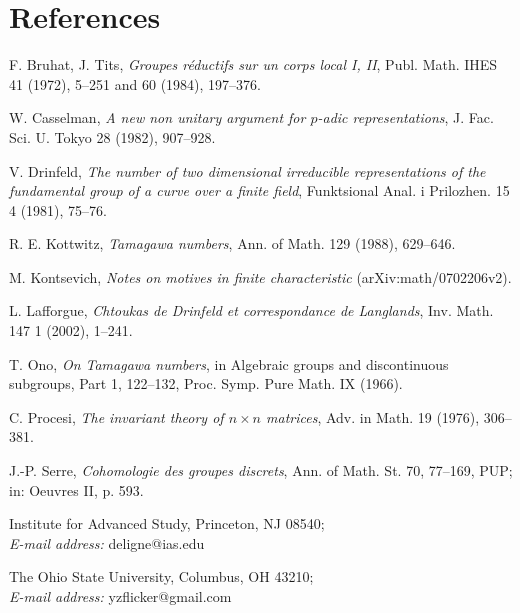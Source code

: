 \documentclass[10pt]{article}
\theoremstyle{deligne}
\begin{document}
\section*{References}
\begin{description}[leftmargin=2.7em,labelwidth=2.4em,style=nextline]
\item[{[BT]}] F. Bruhat, J. Tits, \emph{Groupes réductifs sur un corps local I, II}, Publ. Math. IHES 41 (1972), 5--251 and 60 (1984), 197--376.
\item[{[C]}] W. Casselman, \emph{A new non unitary argument for $p$-adic representations}, J. Fac. Sci. U. Tokyo 28 (1982), 907--928.
\item[{[D]}] V. Drinfeld, \emph{The number of two dimensional irreducible representations of the fundamental group of a curve over a finite field}, Funktsional Anal. i Prilozhen. 15 4 (1981), 75--76.
\item[{[K]}] R. E. Kottwitz, \emph{Tamagawa numbers}, Ann. of Math. 129 (1988), 629--646.
\item[{[Ko]}] M. Kontsevich, \emph{Notes on motives in finite characteristic} (arXiv:math/0702206v2).
\item[{[L]}] L. Lafforgue, \emph{Chtoukas de Drinfeld et correspondance de Langlands}, Inv. Math. 147 1 (2002), 1--241.
\item[{[O]}] T. Ono, \emph{On Tamagawa numbers}, in Algebraic groups and discontinuous subgroups, Part 1, 122--132, Proc. Symp. Pure Math. IX (1966).
\item[{[P]}] C. Procesi, \emph{The invariant theory of $n\times n$ matrices}, Adv. in Math. 19 (1976), 306--381.
\item[{[S]}] J.-P. Serre, \emph{Cohomologie des groupes discrets}, Ann. of Math. St. 70, 77--169, PUP; in: Oeuvres II, p. 593.
\end{description}

Institute for Advanced Study, Princeton, NJ 08540;\\
\emph{E-mail address:} deligne@ias.edu

The Ohio State University, Columbus, OH 43210;\\
\emph{E-mail address:} yzflicker@gmail.com
\end{document}
